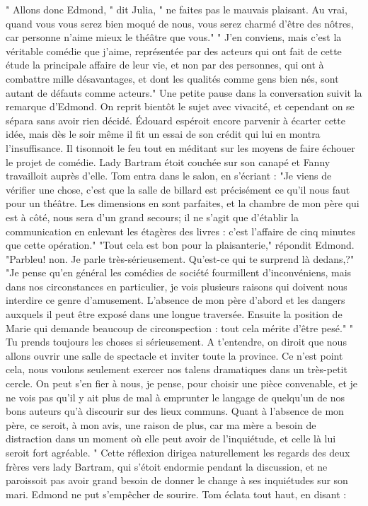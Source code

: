 " Allons donc Edmond, " dit Julia, " ne faites pas le mauvais plaisant. Au vrai, quand vous vous serez bien moqué de nous, vous serez charmé d'être des nôtres, car personne n'aime mieux le théâtre que vous."
" J'en conviens, mais c'est la véritable comédie que j'aime, représentée par des acteurs qui ont fait de cette étude la principale affaire de leur vie, et non par des personnes, qui ont à combattre mille désavantages, et dont les qualités comme gens bien nés, sont autant de défauts comme acteurs."
Une petite pause dans la conversation suivit la remarque d'Edmond. On reprit bientôt le sujet avec vivacité, et cependant on se sépara sans avoir rien décidé. Édouard espéroit encore parvenir à écarter cette idée,\setcounter{page}{104} mais dès le soir même il fit un essai de son crédit qui lui en montra l'insuffisance.
Il tisonnoit le feu tout en méditant sur les moyens de faire échouer le projet de comédie. Lady Bartram étoit couchée sur son canapé et Fanny travailloit auprès d'elle.
Tom entra dans le salon, en s'écriant : "Je viens de vérifier une chose, c'est que la salle de billard est précisément ce qu'il nous faut pour un théâtre. Les dimensions en sont parfaites, et la chambre de mon père qui est à côté, nous sera d'un grand secours; il ne s'agit que d'établir la communication en enlevant les étagères des livres : c'est l'affaire de cinq minutes que cette opération."
"Tout cela est bon pour la plaisanterie," répondit Edmond.
"Parbleu! non. Je parle très-sérieusement. Qu'est-ce qui te surprend là dedans,?"
"Je pense qu'en général les comédies de société fourmillent d'inconvéniens, mais dans nos circonstances en particulier, je vois plusieurs raisons qui doivent nous interdire ce genre d'amusement. L'absence de mon père d'abord et les dangers auxquels il peut être exposé dans une longue traversée. Ensuite la position de Marie qui demande beaucoup de circonspection : tout cela mérite d'être pesé."\setcounter{page}{105} " Tu prends toujours les choses si sérieusement. A t’entendre, on diroit que nous allons ouvrir une salle de spectacle et inviter toute la province. Ce n’est point cela, nous voulons seulement exercer nos talens dramatiques dans un très-petit cercle. On peut s’en fier à nous, je pense, pour choisir une pièce convenable, et je ne vois pas qu’il y ait plus de mal à emprunter le langage de quelqu’un de nos bons auteurs qu’à discourir sur des lieux communs. Quant à l’absence de mon père, ce seroit, à mon avis, une raison de plus, car ma mère a besoin de distraction dans un moment où elle peut avoir de l’inquiétude, et celle là lui seroit fort agréable. " Cette réflexion dirigea naturellement les regards des deux frères vers lady Bartram, qui s’étoit endormie pendant la discussion, et ne paroissoit pas avoir grand besoin de donner le change à ses inquiétudes sur son mari. Edmond ne put s’empêcher de sourire. Tom éclata tout haut, en disant :

